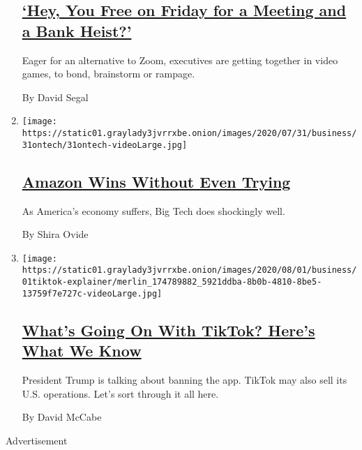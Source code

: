 \begin{enumerate}
  \hypertarget{hey-you-free-on-friday-for-a-meeting-and-a-bank-heist}{%
  \subsection{\texorpdfstring{\href{/2020/07/31/business/video-game-meetings.html}{`Hey,
  You Free on Friday for a Meeting and a Bank
  Heist?'}}{`Hey, You Free on Friday for a Meeting and a Bank Heist?'}}\label{hey-you-free-on-friday-for-a-meeting-and-a-bank-heist}}

  Eager for an alternative to Zoom, executives are getting together in
  video games, to bond, brainstorm or rampage.

  By David Segal
\item
  \texttt{[image: https://static01.graylady3jvrrxbe.onion/images/2020/07/31/business/31ontech/31ontech-videoLarge.jpg]}

  \hypertarget{amazon-wins-without-even-trying}{%
  \subsection{\texorpdfstring{\href{/2020/07/31/technology/amazon-earnings.html}{Amazon
  Wins Without Even
  Trying}}{Amazon Wins Without Even Trying}}\label{amazon-wins-without-even-trying}}

  As America's economy suffers, Big Tech does shockingly well.

  By Shira Ovide
\item
  \texttt{[image: https://static01.graylady3jvrrxbe.onion/images/2020/08/01/business/01tiktok-explainer/merlin\_174789882\_5921ddba-8b0b-4810-8be5-13759f7e727c-videoLarge.jpg]}

  \hypertarget{whats-going-on-with-tiktok-heres-what-we-know}{%
  \subsection{\texorpdfstring{\href{/2020/08/01/technology/tiktok-trump-microsoft-bytedance-china-ban.html}{What's
  Going On With TikTok? Here's What We
  Know}}{What's Going On With TikTok? Here's What We Know}}\label{whats-going-on-with-tiktok-heres-what-we-know}}

  President Trump is talking about banning the app. TikTok may also sell
  its U.S. operations. Let's sort through it all here.

  By David McCabe
\end{enumerate}

Advertisement


